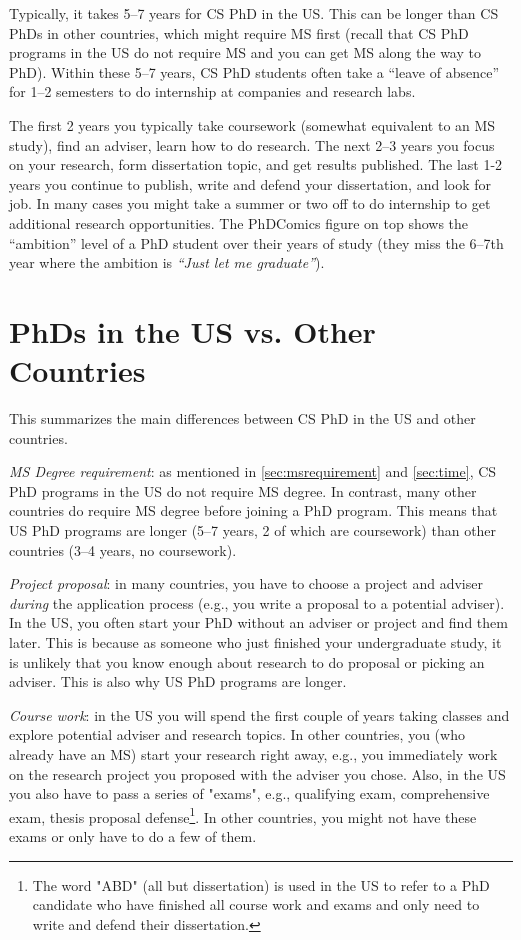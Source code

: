 \documentclass[oneside,11pt]{book}
\begin{document}
Typically, it takes 5--7 years for CS PhD in the US.  This can be longer than CS PhDs in other countries, which might require MS first (recall that CS PhD programs in the US do not require MS and you can get MS along the way to PhD). Within these 5--7 years, CS PhD students often take a ``leave of absence'' for 1--2 semesters to do internship at companies and research labs.

The first 2 years you typically take coursework (somewhat equivalent to an MS study), find an adviser, learn how to do research.  The next 2--3 years you focus on your research, form dissertation topic, and get results published. The last 1-2 years you continue to publish, write and defend your dissertation, and look for job.
In many cases you might take a summer or two off to do internship to get additional research opportunities.
The PhDComics figure on top shows the ``ambition'' level of a PhD student over their years of study (they miss the 6--7th year where the ambition is \emph{``Just let me graduate''}).


\section{PhDs in the US vs. Other Countries}\label{sec:non-us-differences}

This summarizes the main differences between CS PhD in the US and other countries. %

\emph{MS Degree requirement}:  as mentioned in \autoref{sec:msrequirement} and \autoref{sec:time}, CS PhD programs in the US do not require MS degree.  In contrast, many other countries do require MS degree before joining a PhD program.  This means that US PhD programs are longer (5--7 years, 2 of which are coursework) than other countries (3--4 years, no coursework).

\emph{Project proposal}: in many countries, you have to choose a project and adviser \emph{during} the application process (e.g., you write a proposal to a potential adviser). In the US, you often start your PhD without an adviser or project and find them later. This is because as someone who just finished your undergraduate study, it is unlikely that you know enough about research to do proposal or picking an adviser.  This is also why US PhD programs are longer.

\emph{Course work}: in the US you will spend the first couple of years taking classes and explore potential adviser and research topics. In other countries, you (who already have an MS) start your research right away, e.g., you immediately work on the research project you proposed with the adviser you chose. Also, in the US you also have to pass a series of "exams", e.g., qualifying exam, comprehensive exam, thesis proposal defense\footnote{The word "ABD" (all but dissertation) is used in the US to refer to a PhD candidate who have finished all course work and exams and only need to write and defend their dissertation.}. In other countries, you might not have these exams or only have to do a few of them.
\end{document}
